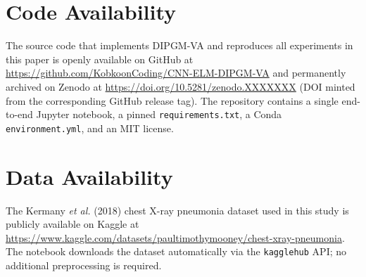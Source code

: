 
\section*{Code Availability}
The source code that implements DIPGM-VA and reproduces all experiments in
this paper is openly available on GitHub at
\url{https://github.com/KobkoonCoding/CNN-ELM-DIPGM-VA} and permanently
archived on Zenodo at \url{https://doi.org/10.5281/zenodo.XXXXXXX}
(DOI minted from the corresponding GitHub release tag). The repository
contains a single end-to-end Jupyter notebook, a pinned
\texttt{requirements.txt}, a Conda \texttt{environment.yml}, and an MIT
license.

\section*{Data Availability}
The Kermany \emph{et al.} (2018) chest X-ray pneumonia dataset used in this
study is publicly available on Kaggle at
\url{https://www.kaggle.com/datasets/paultimothymooney/chest-xray-pneumonia}.
The notebook downloads the dataset automatically via the
\texttt{kagglehub} API; no additional preprocessing is required.
